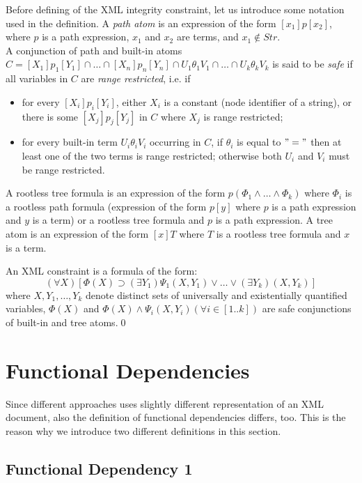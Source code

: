 Before defining of the XML integrity constraint, let us introduce some notation used in the definition. A \emph{path atom} is an expression of the form $[x_1]p[x_2]$, where $p$ is a path expression, $x_1$ and $x_2$ are terms, and $x_1 \not \in Str$.\\
A conjunction of path and built-in atoms $C = [X_1]p_1[Y_1] \cap \dots \cap [X_n]p_n[Y_n] \cap U_1\theta_1 V_1 \cap \dots \cap U_k \theta_k V_k$ is said to be \emph{safe} if all variables in $C$ are \emph{range restricted}, i.e. if
\begin{itemize}
 	\item for every $[X_i]p_i[Y_i]$, either $X_i$ is a constant (node identifier of a string), or there is some $[X_j]p_j[Y_j]$ in $C$ where $X_j$ is range restricted;
    \item for every built-in term $U_i\theta_i V_i$ occurring in $C$, if $\theta_i$ is equal to $"="$ then at least one of the two terms is range restricted; otherwise both $U_i$ and $V_i$ must be range restricted.
 \end{itemize}
A rootless tree formula is an expression of the form $p(\Phi_1 \land \dots \land \Phi_k)$ where $\Phi_i$ is a rootless path formula (expression of the form $p[y]$ where $p$ is a path expression and $y$ is a term) or a rootless tree formula and $p$ is a path expression. A tree atom is an expression of the form $[x]T$ where $T$ is a rootless tree formula and $x$ is a term.

\begin{define}\label{integConstr}
An XML constraint is a formula of the form: $$(\forall X)[\Phi(X)\supset (\exists Y_1)\Psi_1(X,Y_1) \lor \dots \lor (\exists Y_k)(X,Y_k)]$$
where $X,Y_1,\dots, Y_k$ denote distinct sets of universally and existentially quantified variables, $\Phi(X)$ and $\Phi(X) \land \Psi_i(X, Y_i) (\forall i \in [1..k])$ are safe conjunctions of built-in and tree atoms.\qed
\end{define}

\section{Functional Dependencies}

Since different approaches uses slightly different representation of an XML document, also the definition of functional dependencies differs, too. This is the reason why we introduce two different definitions in this section.

\subsection{Functional Dependency 1}

